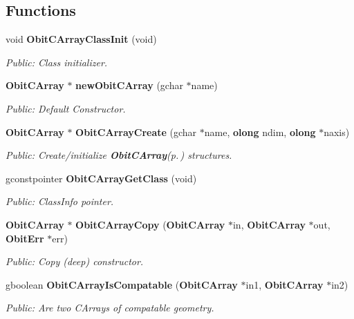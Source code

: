 \subsection*{Functions}
\begin{CompactItemize}
\item 
void {\bf Obit\-CArray\-Class\-Init} (void)
\begin{CompactList}\small\item\em Public: Class initializer. \item\end{CompactList}\item 
{\bf Obit\-CArray} $\ast$ {\bf new\-Obit\-CArray} (gchar $\ast$name)
\begin{CompactList}\small\item\em Public: Default Constructor. \item\end{CompactList}\item 
{\bf Obit\-CArray} $\ast$ {\bf Obit\-CArray\-Create} (gchar $\ast$name, {\bf olong} ndim, {\bf olong} $\ast$naxis)
\begin{CompactList}\small\item\em Public: Create/initialize {\bf Obit\-CArray}{\rm (p.\,\pageref{structObitCArray})} structures. \item\end{CompactList}\item 
gconstpointer {\bf Obit\-CArray\-Get\-Class} (void)
\begin{CompactList}\small\item\em Public: Class\-Info pointer. \item\end{CompactList}\item 
{\bf Obit\-CArray} $\ast$ {\bf Obit\-CArray\-Copy} ({\bf Obit\-CArray} $\ast$in, {\bf Obit\-CArray} $\ast$out, {\bf Obit\-Err} $\ast$err)
\begin{CompactList}\small\item\em Public: Copy (deep) constructor. \item\end{CompactList}\item 
gboolean {\bf Obit\-CArray\-Is\-Compatable} ({\bf Obit\-CArray} $\ast$in1, {\bf Obit\-CArray} $\ast$in2)
\begin{CompactList}\small\item\em Public: Are two CArrays of compatable geometry. \item\end{CompactList}\item 

\end{CompactItemize}
